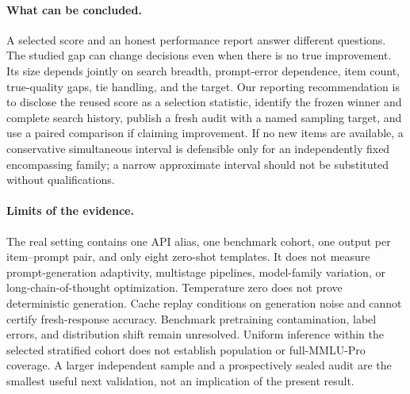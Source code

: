 \documentclass{article}
\begin{document}
\paragraph{What can be concluded.}
A selected score and an honest performance report answer different questions. The studied gap can change decisions even when there is no true improvement. Its size depends jointly on search breadth, prompt-error dependence, item count, true-quality gaps, tie handling, and the target. Our reporting recommendation is to disclose the reused score as a selection statistic, identify the frozen winner and complete search history, publish a fresh audit with a named sampling target, and use a paired comparison if claiming improvement. If no new items are available, a conservative simultaneous interval is defensible only for an independently fixed encompassing family; a narrow approximate interval should not be substituted without qualifications.

\paragraph{Limits of the evidence.}
The real setting contains one API alias, one benchmark cohort, one output per item--prompt pair, and only eight zero-shot templates. It does not measure prompt-generation adaptivity, multistage pipelines, model-family variation, or long-chain-of-thought optimization. Temperature zero does not prove deterministic generation. Cache replay conditions on generation noise and cannot certify fresh-response accuracy. Benchmark pretraining contamination, label errors, and distribution shift remain unresolved. Uniform inference within the selected stratified cohort does not establish population or full-MMLU-Pro coverage. A larger independent sample and a prospectively sealed audit are the smallest useful next validation, not an implication of the present result.
\end{document}
